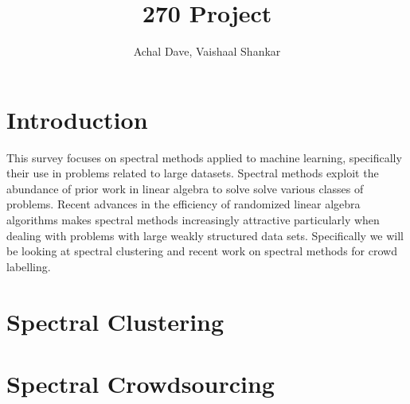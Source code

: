 \documentclass{article}
\title{270 Project}
\author{Achal Dave, Vaishaal Shankar}
\date{}
\begin{document}
\maketitle
\tableofcontents
\clearpage


\section{Introduction}
This survey focuses on spectral methods applied to machine learning,
specifically their use in problems related to large datasets. Spectral methods
exploit the abundance of prior work in linear algebra to solve solve various
classes of problems. Recent advances in the efficiency of randomized linear
algebra algorithms makes spectral methods increasingly attractive particularly
when dealing with problems with large weakly structured data sets. Specifically
we will be looking at spectral clustering and recent work on spectral methods
for crowd labelling.

\section{Spectral Clustering}


\newpage

\section{Spectral Crowdsourcing}




\end{document}
